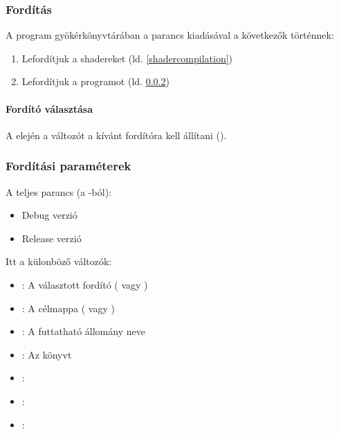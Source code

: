 {\subsubsection{Ford\'it\'as}
A program gy\"ok\'erk\"onyvt\'ar\'aban a  parancs kiad\'as\'aval a k\"ovetkez\H ok t\"ort\'ennek:
\begin{enumerate}
	\item Leford\'itjuk a                                                                            shadereket (ld. \ref{shadercompilation})
	\item Leford\'itjuk a programot (ld. \ref{compileoptions})
\end{enumerate}

\paragraph{Ford\'it\'o v\'alaszt\'asa}
A  elej\'en a  v\'altoz\'ot a k\'iv\'ant ford\'it\'ora kell \'all\'itani ().
\subsubsection{Ford\'it\'asi param\'eterek}\label{compileoptions}
A teljes parancs (a -b\'ol): 
\begin{itemize}
	\item Debug verzi\'o
	\item Release verzi\'o
\end{itemize}
Itt a k\"ulonb\"oz\H o v\'altoz\'ok:
\begin{itemize}
	\item {}: A v\'alasztott ford\'it\'o ( vagy )
	\item {}: A c\'elmappa ( vagy ) 
	\item {}: A futtathat\'o \'allom\'any neve
	\item {}: Az  k\"onyvt\
	\item {}: 
	\item {}: 
	\item {}: 
\end{itemize}

}
